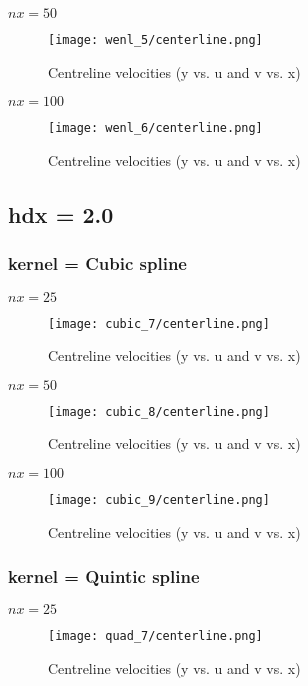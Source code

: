 \documentclass{article}
\begin{document}
\newpage
$nx = 50 $
\\
\begin{figure}[H]   \label{figure}
\texttt{[image: wenl\_5/centerline.png]}
\caption{Centreline velocities (y vs. u and v vs. x)}
\label{figure:}
\end{figure}

\newpage
$nx = 100 $
\\
\begin{figure}[H]   \label{figure}
\texttt{[image: wenl\_6/centerline.png]}
\caption{Centreline velocities (y vs. u and v vs. x)}
\label{figure:}
\end{figure}

\newpage
\subsection{hdx = 2.0}
\subsubsection{kernel = Cubic spline}
$nx = 25 $
\\
\begin{figure}[H]   \label{figure}
\texttt{[image: cubic\_7/centerline.png]}
\caption{Centreline velocities (y vs. u and v vs. x)}
\label{figure:}
\end{figure}

\newpage
$nx = 50 $
\\
\begin{figure}[H]   \label{figure}
\texttt{[image: cubic\_8/centerline.png]}
\caption{Centreline velocities (y vs. u and v vs. x)}
\label{figure:}
\end{figure}

\newpage
$nx = 100 $
\\
\begin{figure}[H]   \label{figure}
\texttt{[image: cubic\_9/centerline.png]}
\caption{Centreline velocities (y vs. u and v vs. x)}
\label{figure:}
\end{figure}

\newpage
\subsubsection{kernel = Quintic spline}
$nx = 25 $
\\
\begin{figure}[H]   \label{figure}
\texttt{[image: quad\_7/centerline.png]}
\caption{Centreline velocities (y vs. u and v vs. x)}
\label{figure:}
\end{figure}
\end{document}
